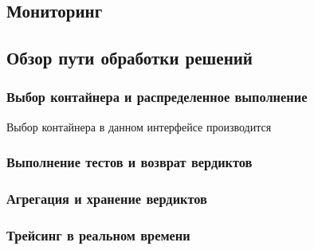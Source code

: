 

\subsection{Мониторинг}



\subsection{Обзор пути обработки решений}

\subsubsection{Выбор контайнера и распределенное выполнение}
Выбор контайнера в данном интерфейсе производится 

\subsubsection{Выполнение тестов и возврат вердиктов}

\subsubsection{Агрегация и хранение вердиктов}

\subsubsection{Трейсинг в реальном времени}

